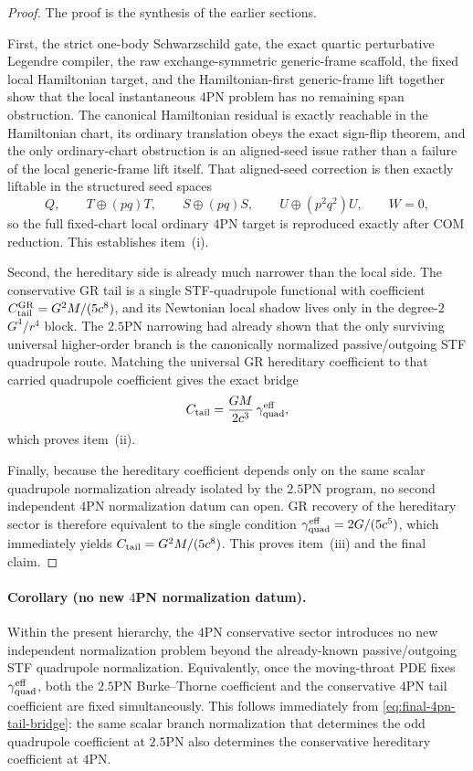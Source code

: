 \documentclass[11pt]{article}
\begin{document}
\begin{proof}
The proof is the synthesis of the earlier sections.

First, the strict one-body Schwarzschild gate, the exact quartic perturbative
Legendre compiler, the raw exchange-symmetric generic-frame scaffold, the fixed
local Hamiltonian target, and the Hamiltonian-first generic-frame lift together
show that the local instantaneous $4$PN problem has no remaining span
obstruction.  The canonical Hamiltonian residual is exactly reachable in the
Hamiltonian chart, its ordinary translation obeys the exact sign-flip theorem,
and the only ordinary-chart obstruction is an aligned-seed issue rather than a
failure of the local generic-frame lift itself.  That aligned-seed correction is
then exactly liftable in the structured seed spaces
\[
Q,
\qquad
T\oplus(pq)T,
\qquad
S\oplus(pq)S,
\qquad
U\oplus(p^2q^2)U,
\qquad
W=0,
\]
so the full fixed-chart local ordinary $4$PN target is reproduced exactly after
COM reduction.  This establishes item~(i).

Second, the hereditary side is already much narrower than the local side.  The
conservative GR tail is a single STF-quadrupole functional with coefficient
\(C_{\rm tail}^{\rm GR}=G^2M/(5c^8)\), and its Newtonian local shadow lives only
in the degree-$2$ \(G^4/r^4\) block.  The $2.5$PN narrowing had already shown
that the only surviving universal higher-order branch is the canonically
normalized passive/outgoing STF quadrupole route.  Matching the universal GR
hereditary coefficient to that carried quadrupole coefficient gives the exact
bridge
\[
C_{\rm tail}=\frac{GM}{2c^3}\,\gamma_{\rm quad}^{\rm eff},
\]
which proves item~(ii).

Finally, because the hereditary coefficient depends only on the same scalar
quadrupole normalization already isolated by the $2.5$PN program, no second
independent $4$PN normalization datum can open.  GR recovery of the hereditary
sector is therefore equivalent to the single condition
\(
\gamma_{\rm quad}^{\rm eff}=2G/(5c^5)
\), which immediately yields
\(
C_{\rm tail}=G^2M/(5c^8)
\).  This proves item~(iii) and the final claim.
\end{proof}

\paragraph{Corollary (no new \texorpdfstring{$4$}{4}PN normalization datum).}
Within the present hierarchy, the $4$PN conservative sector introduces no new
independent normalization problem beyond the already-known passive/outgoing STF
quadrupole normalization.  Equivalently, once the moving-throat PDE fixes
\(\gamma_{\rm quad}^{\rm eff}\), both the $2.5$PN Burke--Thorne coefficient and
the conservative $4$PN tail coefficient are fixed simultaneously.  This follows
immediately from \eqref{eq:final-4pn-tail-bridge}: the same scalar branch
normalization that determines the odd quadrupole coefficient at $2.5$PN also
determines the conservative hereditary coefficient at $4$PN.
\end{document}
